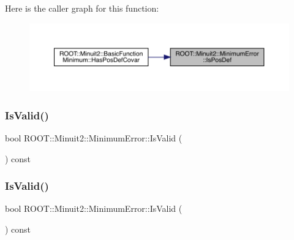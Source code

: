 Here is the caller graph for this function\+:\nopagebreak
\begin{figure}[H]
\begin{center}
\leavevmode
\includegraphics[width=350pt]{d5/d32/classROOT_1_1Minuit2_1_1MinimumError_afffbed3fdd6785c959ca619a59aaaf74_icgraph}
\end{center}
\end{figure}
\mbox{\label{classROOT_1_1Minuit2_1_1MinimumError_a0e9a9c525f7ac2e5dc5c7973056a852b}} 
\subsubsection{\texorpdfstring{IsValid()}{IsValid()}\hspace{0.1cm}{\footnotesize\ttfamily [1/2]}}
{\footnotesize\ttfamily bool R\+O\+O\+T\+::\+Minuit2\+::\+Minimum\+Error\+::\+Is\+Valid (\begin{DoxyParamCaption}{ }\end{DoxyParamCaption}) const\hspace{0.3cm}{\ttfamily [inline]}}

\mbox{\label{classROOT_1_1Minuit2_1_1MinimumError_a0e9a9c525f7ac2e5dc5c7973056a852b}} 
\subsubsection{\texorpdfstring{IsValid()}{IsValid()}\hspace{0.1cm}{\footnotesize\ttfamily [2/2]}}
{\footnotesize\ttfamily bool R\+O\+O\+T\+::\+Minuit2\+::\+Minimum\+Error\+::\+Is\+Valid (\begin{DoxyParamCaption}{ }\end{DoxyParamCaption}) const\hspace{0.3cm}{\ttfamily [inline]}}

